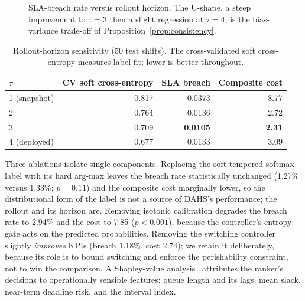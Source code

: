 \documentclass[conference]{IEEEtran}
\begin{document}
\begin{figure}[t]
\centering
{}
\caption{SLA-breach rate versus rollout horizon. The U-shape, a steep improvement
to $\tau{=}3$ then a slight regression at $\tau{=}4$, is the bias-variance
trade-off of Proposition~\ref{prop:consistency}.}
\label{fig:tau}
\end{figure}

\begin{table}[t]
\centering
\caption{Rollout-horizon sensitivity (50 test shifts). The cross-validated soft
cross-entropy measures label fit; lower is better throughout.}
\label{tab:tau}
\begin{tabular}{lrrr}
\toprule
$\tau$ & CV soft cross-entropy & SLA breach & Composite cost \\
\midrule
1 (snapshot) & 0.817 & 0.0373 & 8.77 \\
2            & 0.764 & 0.0136 & 2.72 \\
3            & 0.709 & \textbf{0.0105} & \textbf{2.31} \\
4 (deployed) & 0.677 & 0.0133 & 3.09 \\
\bottomrule
\end{tabular}
\end{table}

Three ablations isolate single components. Replacing the soft tempered-softmax
label with its hard arg-max leaves the breach rate statistically unchanged (1.27\%
versus 1.33\%; $p = 0.11$) and the composite cost marginally lower, so the
distributional form of the label is not a source of DAHS's performance; the rollout
and its horizon are. Removing isotonic calibration degrades the breach rate to
2.94\% and the cost to 7.85 ($p < 0.001$), because the controller's entropy gate
acts on the predicted probabilities. Removing the switching controller slightly
\emph{improves} KPIs (breach 1.18\%, cost 2.74); we retain it deliberately, because
its role is to bound switching and enforce the perishability constraint, not to win
the comparison. A Shapley-value analysis~\cite{lundberg2017shap} attributes the
ranker's decisions to operationally sensible features: queue length and its lags,
mean slack, near-term deadline risk, and the interval index.
\end{document}

